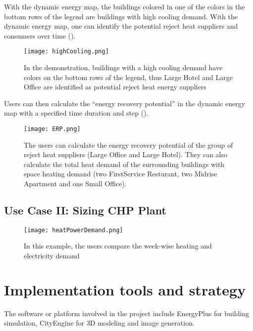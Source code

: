 With the dynamic energy map, the buildings colored in one of the
colors in the bottom rows of the legend are buildings with high
cooling demand. With the dynamic energy map, one can identify
the potential reject heat suppliers and consumers over time
().

\begin{figure}[h!]
  \centering
  \texttt{[image: highCooling.png]}
  \caption[Identify Buildings with High Cooling Demand]{In the
    demonstration, buildings with a high cooling demand have colors on
    the bottom rows of the legend, thus Large Hotel and Large Office
    are identified as potential reject heat energy suppliers}
  \label{fig:highCooling}
\end{figure}

Users can then calculate the ``energy recovery potential'' in the
dynamic energy map with a specified time duration and step
().

\begin{figure}[h!]
  \centering
  \texttt{[image: ERP.png]}
  \caption[Calculate Energy Recovery Potential]{The users can
    calculate the energy recovery potential of the group of reject
    heat suppliers (Large Office and Large Hotel). They can also
    calculate the total heat demand of the surrounding buildings with
    space heating demand (two FirstService Resturant, two Midrise
    Apartment and one Small Office).}
  \label{fig:ERP}
\end{figure}

\subsection{Use Case II: Sizing CHP Plant}
\begin{figure}[h!]
  \centering
  \texttt{[image: heatPowerDemand.png]}
  \caption[Comparing Community Heating and Electricity Demand]{In this
    example, the users compare the week-wise heating and electricity
    demand}
  \label{fig:heatPowerDemand}
\end{figure}

\section {Implementation tools and strategy}
The software or platform involved in the project include EnergyPlus
for building simulation, CityEngine for 3D modeling and image
generation. 


